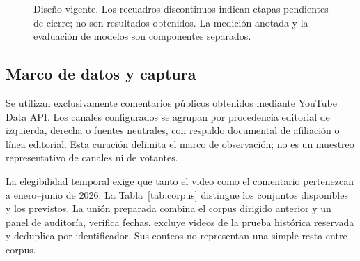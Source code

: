 \documentclass[conference,letterpaper]{IEEEtran}
\begin{document}
\begin{figure}[t]
\centering
{}
\caption{Diseño vigente. Los recuadros discontinuos indican etapas pendientes de cierre; no son resultados obtenidos. La medición anotada y la evaluación de modelos son componentes separados.}
\label{fig:metodo}
\end{figure}

\subsection{Marco de datos y captura}
Se utilizan exclusivamente comentarios públicos obtenidos mediante YouTube Data API. Los canales configurados se agrupan por procedencia editorial de izquierda, derecha o fuentes neutrales, con respaldo documental de afiliación o línea editorial. Esta curación delimita el marco de observación; no es un muestreo representativo de canales ni de votantes.

La elegibilidad temporal exige que tanto el video como el comentario pertenezcan a enero--junio de 2026. La Tabla~\ref{tab:corpus} distingue los conjuntos disponibles y los previstos. La unión preparada combina el corpus dirigido anterior y un panel de auditoría, verifica fechas, excluye videos de la prueba histórica reservada y deduplica por identificador. Sus conteos no representan una simple resta entre corpus.
\end{document}
